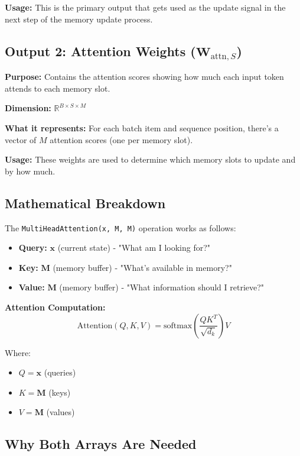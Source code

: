 \documentclass{article}
\begin{document}
\textbf{Usage:} This is the primary output that gets used as the update signal in the next step of the memory update process.

\subsection{Output 2: Attention Weights ($\mathbf{W}_{\text{attn},S}$)}

\textbf{Purpose:} Contains the attention scores showing how much each input token attends to each memory slot.

\textbf{Dimension:} $\mathbb{R}^{B \times S \times M}$

\textbf{What it represents:} For each batch item and sequence position, there's a vector of $M$ attention scores (one per memory slot).

\textbf{Usage:} These weights are used to determine which memory slots to update and by how much.

\subsection{Mathematical Breakdown}

The \texttt{MultiHeadAttention(x, M, M)} operation works as follows:

\begin{itemize}
\item \textbf{Query:} $\mathbf{x}$ (current state) - "What am I looking for?"
\item \textbf{Key:} $\mathbf{M}$ (memory buffer) - "What's available in memory?"
\item \textbf{Value:} $\mathbf{M}$ (memory buffer) - "What information should I retrieve?"
\end{itemize}

\textbf{Attention Computation:}
\begin{equation}
\text{Attention}(Q, K, V) = \text{softmax}\left(\frac{QK^T}{\sqrt{d_k}}\right)V
\end{equation}

Where:
\begin{itemize}
\item $Q = \mathbf{x}$ (queries)
\item $K = \mathbf{M}$ (keys)
\item $V = \mathbf{M}$ (values)
\end{itemize}

\subsection{Why Both Arrays Are Needed}
\end{document}
